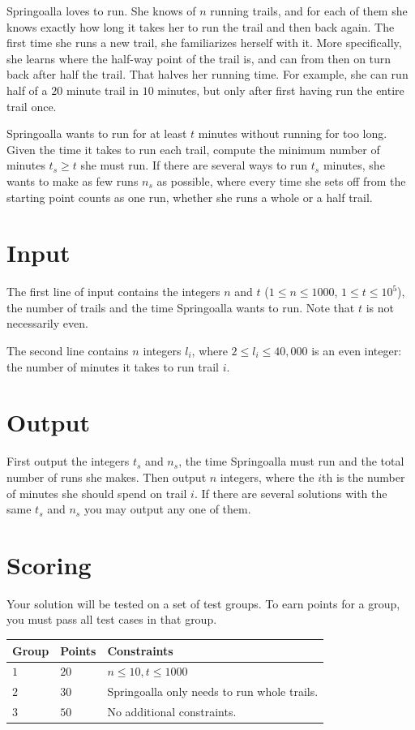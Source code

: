 Springoalla loves to run.
She knows of $n$ running trails, and for each of them she knows exactly how long it takes her to run the trail and then back again.
The first time she runs a new trail, she familiarizes herself with it.
More specifically, she learns where the half-way point of the trail is, and can from then on turn back after half the trail.
That halves her running time.
For example, she can run half of a $20$ minute trail in $10$ minutes, but only after first having run the entire trail once.

Springoalla wants to run for at least $t$ minutes without running for too long.
Given the time it takes to run each trail, compute the minimum number of minutes $t_s \ge t$ she must run.
If there are several ways to run $t_s$ minutes, she wants to make as few runs $n_s$ as possible, where every time she sets off from the starting point counts as one run, whether she runs a whole or a half trail.

\section*{Input}
The first line of input contains the integers $n$ and $t$ ($1 \le n \le 1000$, $1 \le t \le 10^5$), the number of trails and the time Springoalla wants to run.
Note that $t$ is not necessarily even.

The second line contains $n$ integers $l_i$, where $2 \le l_i \le 40{,}000$ is an even integer: the number of minutes it takes to run trail $i$.

\section*{Output}
First output the integers $t_s$ and $n_s$, the time Springoalla must run and the total number of runs she makes.
Then output $n$ integers, where the $i$th is the number of minutes she should spend on trail $i$.
If there are several solutions with the same $t_s$ and $n_s$ you may output any one of them.


\section*{Scoring}
Your solution will be tested on a set of test groups.
To earn points for a group, you must pass all test cases in that group.

\noindent
\begin{tabular}{| l | l | p{12cm} |}
  \hline
  \textbf{Group} & \textbf{Points} & \textbf{Constraints} \\ \hline
  $1$    & $20$        & $n \le 10, t \le 1000$ \\ \hline
  $2$    & $30$        & Springoalla only needs to run whole trails. \\ \hline
  $3$    & $50$        & No additional constraints. \\ \hline 
\end{tabular}
